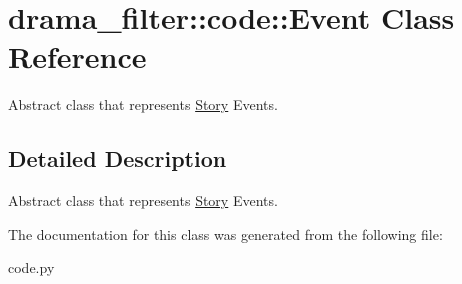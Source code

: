 \hypertarget{classdrama__filter_1_1code_1_1Event}{
\section{drama\_\-filter::code::Event Class Reference}
\label{classdrama__filter_1_1code_1_1Event}
}


Abstract class that represents \hyperlink{classdrama__filter_1_1code_1_1Story}{Story} Events.  




\subsection{Detailed Description}
Abstract class that represents \hyperlink{classdrama__filter_1_1code_1_1Story}{Story} Events. 

The documentation for this class was generated from the following file:\begin{DoxyCompactItemize}
\item 
code.py\end{DoxyCompactItemize}
